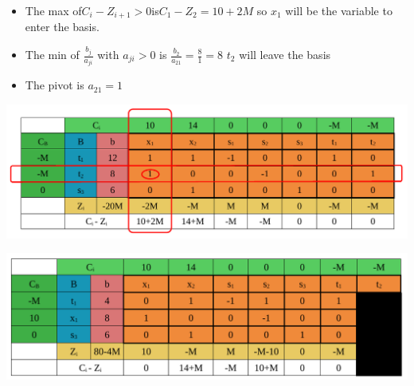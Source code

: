 \vspace{0.25cm}
\begin{itemize}   
\item The max of\hspace{0.2cm}\(C_i - Z_{i+1} > 0\)\hspace{0.2cm}is\hspace{0.2cm}\(C_1 - Z_2 = 10+2M\)\hspace{0.1cm} so \(x_1\) 
will be the variable to enter the basis.
\item The min of \hspace{0.1cm}\(\frac{b_j}{a_{ji}}\)\hspace{0.1cm} with \(a_{ji} > 0\)\hspace{0.1cm} is \hspace{0.1cm} \(\frac{b_2}{a_{21}} = \frac{8}{1} = 8\)\hspace{0.35cm} \(t_2\)
will leave the basis
\item The pivot is \(a_{21} = 1\)
 
\end{itemize}


\vspace{0.25cm}




\begin{center}
    \includegraphics{Chapters/Simplexe/EX/EX6/ex6.2.pdf}
\end{center}

\begin{center}
    \includegraphics{Chapters/Simplexe/EX/EX6/ex6.3.pdf}
\end{center}

